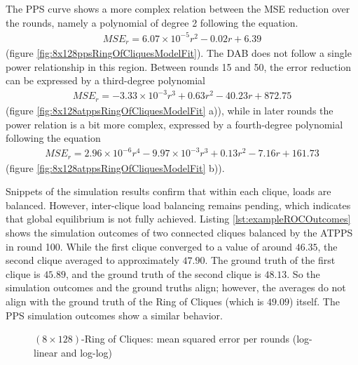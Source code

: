 The PPS curve shows a more complex relation between the MSE reduction over the rounds, namely a polynomial of degree 2 following the equation.
\begin{align}
    MSE_r=6.07\times 10^{-5}r^{2}-0.02r+6.39    
\end{align}
(figure \ref{fig:8x128ppsRingOfCliquesModelFit}). The DAB does not follow a single power relationship in this region. Between rounds 15 and 50, the error reduction can be expressed by a third-degree polynomial
\begin{align}
    MSE_r=-3.33\times 10^{-3}r^{3}+0.63r^{2}-40.23r+872.75    
\end{align}
(figure \ref{fig:8x128atppsRingOfCliquesModelFit} a)), while in later rounds the power relation is a bit more complex, expressed by a fourth-degree polynomial following the equation
\begin{align}
    MSE_r=2.96 \times 10^{-6}r^{4}-9.97\times 10^{-3}r^{3}+0.13r^{2}-7.16r+161.73    
\end{align}
(figure \ref{fig:8x128atppsRingOfCliquesModelFit} b)).

Snippets of the simulation results confirm that within each clique, loads are balanced. However, inter-clique load balancing remains pending, which indicates that global equilibrium is not fully achieved. Listing \ref{lst:exampleROCOutcomes} shows the simulation outcomes of two connected cliques balanced by the ATPPS in round 100. While the first clique converged to a value of around $46.35$, the second clique averaged to approximately $47.90$. The ground truth of the first clique is $45.89$, and the ground truth of the second clique is $48.13$. So the simulation outcomes and the ground truths align; however, the averages do not align with the ground truth of the Ring of Cliques (which is $49.09$) itself. The PPS simulation outcomes show a similar behavior.
\begin{figure}[!ht]
    \centering
    \hfil
    \caption{$(8\times128)$-Ring of Cliques: mean squared error per rounds (log-linear and log-log)}
        \label{fig:8x128RingOfCliquesLog_LogLog}
\end{figure}

